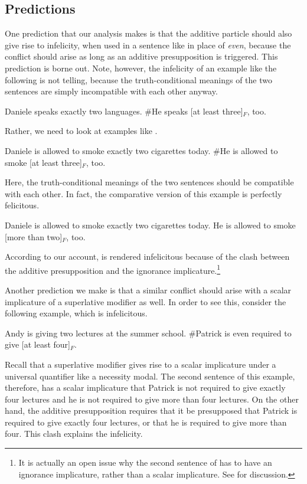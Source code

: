 \documentclass[output=paper]{langscibook}
\begin{document}
\subsection{Predictions}

One prediction that our analysis makes is that the additive particle should also give rise to infelicity, when used in a sentence like  in place of \textit{even}, because the conflict should arise as long as an additive presupposition is triggered. This prediction is borne out. Note, however, the infelicity of an example like the following is not telling, because the truth-conditional meanings of the two sentences are simply incompatible with each other anyway.

    \ea Daniele speaks exactly two languages. \#He speaks [at least three]$_F$, too.\z

\noindent Rather, we need to look at examples like .

    \ea Daniele is allowed to smoke exactly two cigarettes today. \#He is allowed to smoke [at least three]$_F$, too.\label{don-sud:daniele}\z

\noindent Here, the truth-conditional meanings of the two sentences should be compatible with each other. In fact, the comparative version of this example is perfectly felicitous.

    \ea Daniele is allowed to smoke exactly two cigarettes today. He is allowed to smoke [more than two]$_F$, too.\z

\noindent According to our account,  is rendered infelicitous because of the clash between the additive presupposition and the ignorance implicature.\footnote{It is actually an open issue why the second sentence of  has to have an ignorance implicature, rather than a scalar implicature. See \citet{buccolahaida:18} for discussion.}

Another prediction we make is that a similar conflict should arise with a scalar implicature of a superlative modifier as well. In order to see this, consider the following example, which is infelicitous.

    \ea
    Andy is giving two lectures at the summer school.
    \#Patrick is even required to give [at least four]$_F$.
    \z

\noindent Recall that a superlative modifier gives rise to a scalar implicature under a universal quantifier like a necessity modal. The second sentence of this example, therefore, has a scalar implicature that Patrick is not required to give exactly four lectures and he is not required to give more than four lectures. On the other hand, the additive presupposition requires that it be presupposed that Patrick is required to give exactly four lectures, or that he is required to give more than four. This clash explains the infelicity.
\end{document}
